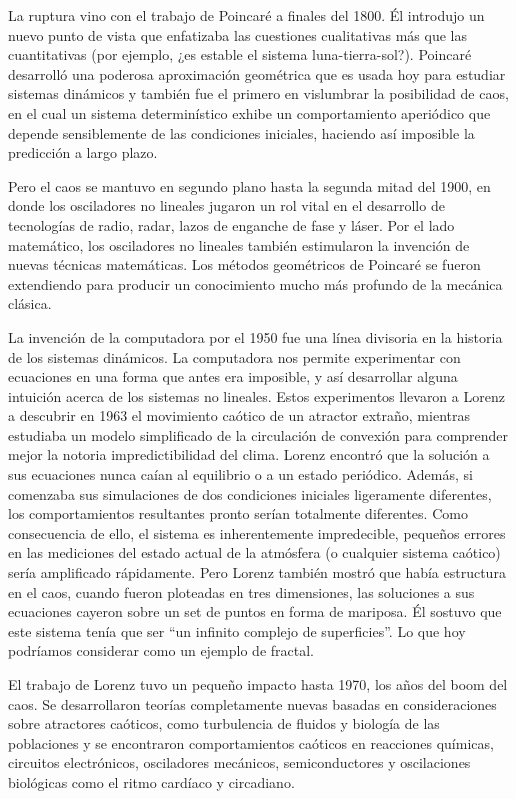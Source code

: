 La ruptura vino con el trabajo de Poincaré a finales del 1800.
Él introdujo un nuevo punto de vista que enfatizaba las cuestiones cualitativas más que las cuantitativas (por ejemplo, ¿es estable el sistema luna-tierra-sol?).
Poincaré desarrolló una poderosa aproximación geométrica que es usada hoy para estudiar sistemas dinámicos y también fue el primero en vislumbrar la posibilidad
de caos, en el cual un sistema determinístico exhibe un comportamiento aperiódico que depende sensiblemente de las condiciones iniciales, haciendo así imposible la predicción a largo plazo.

Pero el caos se mantuvo en segundo plano hasta la segunda mitad del 1900, en donde los osciladores no lineales jugaron un rol vital en el desarrollo de tecnologías de radio, radar, lazos de enganche de fase y láser.
Por el lado matemático, los osciladores no lineales también estimularon la invención de nuevas técnicas matemáticas.
Los métodos geométricos de Poincaré se fueron extendiendo para producir un conocimiento mucho más profundo de la mecánica clásica.

La invención de la computadora por el 1950 fue una línea divisoria en la historia de los sistemas dinámicos.
La computadora nos permite experimentar con ecuaciones en una forma que antes era imposible, y así desarrollar alguna intuición acerca de los sistemas no lineales.
Estos experimentos llevaron a Lorenz a descubrir en 1963 el movimiento caótico de un atractor extraño, mientras estudiaba un modelo simplificado de la circulación de convexión para comprender mejor la notoria impredictibilidad del clima.
Lorenz encontró que la solución a sus ecuaciones nunca caían al equilibrio o a un estado periódico.
Además, si comenzaba sus simulaciones de dos condiciones iniciales ligeramente diferentes, los comportamientos resultantes pronto serían
totalmente diferentes.
Como consecuencia de ello, el sistema es inherentemente impredecible, pequeños errores en las mediciones del estado actual de la atmósfera (o cualquier sistema caótico)
sería amplificado rápidamente.
Pero Lorenz también mostró que había estructura en el caos, cuando fueron ploteadas en tres dimensiones, las soluciones a sus ecuaciones cayeron sobre un
set de puntos en forma de mariposa.
Él sostuvo que este sistema tenía que ser “un infinito complejo de superficies”.
Lo que hoy podríamos considerar como un ejemplo de fractal.

El trabajo de Lorenz tuvo un pequeño impacto hasta 1970, los años del boom del caos.
Se desarrollaron teorías completamente nuevas basadas en consideraciones sobre atractores caóticos, como turbulencia de fluidos y biología de las poblaciones y se encontraron comportamientos caóticos en reacciones químicas, circuitos electrónicos, osciladores mecánicos, semiconductores y oscilaciones biológicas como el ritmo cardíaco y circadiano.

